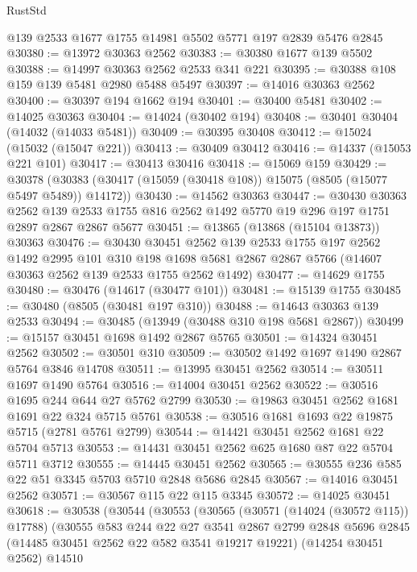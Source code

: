 \begin{lexlean}{RustStd}
\begin{coremodule}
    @139
    @2533
    @1677
    @1755
    @14981
    @5502
    @5771
    @197
    @2839
    @5476
    @2845
@30380 := @13972 @30363 @2562
@30383 := @30380 @1677 @139 @5502
@30388 := @14997 @30363 @2562 @2533 @341 @221
@30395 := @30388 @108 @159 @139 @5481 @2980 @5488 @5497
@30397 := @14016 @30363 @2562
@30400 := @30397 @194 @1662 @194
@30401 := @30400 @5481
@30402 := @14025 @30363
@30404 := @14024 (@30402 @194)
@30408 := @30401 @30404 (@14032 (@14033 @5481))
@30409 := @30395 @30408
@30412 := @15024 (@15032 (@15047 @221))
@30413 := @30409 @30412
@30416 := @14337 (@15053 @221 @101)
@30417 := @30413 @30416
@30418 := @15069 @159
@30429 := @30378 (@30383 (@30417 (@15059 (@30418 @108)) @15075 (@8505 (@15077 @5497 @5489)) @14172))
@30430 := @14562 @30363
@30447 := @30430
    @30363
    @2562
    @139
    @2533
    @1755
    @816
    @2562
    @1492
    @5770
    @19
    @296
    @197
    @1751
    @2897
    @2867
    @2867
    @5677
@30451 := @13865 (@13868 (@15104 @13873)) @30363
@30476 := @30430
    @30451
    @2562
    @139
    @2533
    @1755
    @197
    @2562
    @1492
    @2995
    @101
    @310
    @198
    @1698
    @5681
    @2867
    @2867
    @5766
    (@14607 @30363 @2562 @139 @2533 @1755 @2562 @1492)
@30477 := @14629 @1755
@30480 := @30476 (@14617 (@30477 @101))
@30481 := @15139 @1755
@30485 := @30480 (@8505 (@30481 @197 @310))
@30488 := @14643 @30363 @139 @2533
@30494 := @30485 (@13949 (@30488 @310 @198 @5681 @2867))
@30499 := @15157 @30451 @1698 @1492 @2867 @5765
@30501 := @14324 @30451 @2562
@30502 := @30501 @310
@30509 := @30502 @1492 @1697 @1490 @2867 @5764 @3846 @14708
@30511 := @13995 @30451 @2562
@30514 := @30511 @1697 @1490 @5764
@30516 := @14004 @30451 @2562
@30522 := @30516 @1695 @244 @644 @27 @5762 @2799
@30530 := @19863 @30451 @2562 @1681 @1691 @22 @324 @5715 @5761
@30538 := @30516 @1681 @1693 @22 @19875 @5715 (@2781 @5761 @2799)
@30544 := @14421 @30451 @2562 @1681 @22 @5704 @5713
@30553 := @14431 @30451 @2562 @625 @1680 @87 @22 @5704 @5711 @3712
@30555 := @14445 @30451 @2562
@30565 := @30555 @236 @585 @22 @51 @3345 @5703 @5710 @2848 @5686 @2845
@30567 := @14016 @30451 @2562
@30571 := @30567 @115 @22 @115 @3345
@30572 := @14025 @30451
@30618 := @30538
    (@30544
      (@30553
        (@30565
          (@30571 (@14024 (@30572 @115)) @17788)
          (@30555
            @583
            @244
            @22
            @27
            @3541
            @2867
            @2799
            @2848
            @5696
            @2845
            (@14485 @30451 @2562 @22 @582 @3541 @19217 @19221)
            (@14254 @30451 @2562)
            @14510

\end{coremodule}
\end{lexlean}
